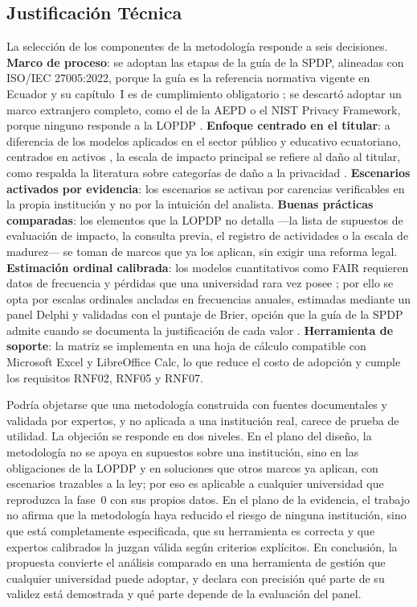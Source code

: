 \subsection{Justificación Técnica}

La selección de los componentes de la metodología responde a seis decisiones. \textbf{Marco de proceso}: se adoptan las etapas de la guía de la SPDP, alineadas con ISO/IEC 27005:2022, porque la guía es la referencia normativa vigente en Ecuador y su capítulo~I es de cumplimiento obligatorio \cite{spdp2025guia,spdp2026guiav2}; se descartó adoptar un marco extranjero completo, como el de la AEPD o el NIST Privacy Framework, porque ninguno responde a la LOPDP \cite{aepd2021riesgo,nist2020privacy}. \textbf{Enfoque centrado en el titular}: a diferencia de los modelos aplicados en el sector público y educativo ecuatoriano, centrados en activos \cite{patino2018ict,lopezvasco2025iso}, la escala de impacto principal se refiere al daño al titular, como respalda la literatura sobre categorías de daño a la privacidad \cite{wairimu2025harm}. \textbf{Escenarios activados por evidencia}: los escenarios se activan por carencias verificables en la propia institución y no por la intuición del analista. \textbf{Buenas prácticas comparadas}: los elementos que la LOPDP no detalla ---la lista de supuestos de evaluación de impacto, la consulta previa, el registro de actividades o la escala de madurez--- se toman de marcos que ya los aplican, sin exigir una reforma legal. \textbf{Estimación ordinal calibrada}: los modelos cuantitativos como FAIR requieren datos de frecuencia y pérdidas que una universidad rara vez posee \cite{wang2020fair}; por ello se opta por escalas ordinales ancladas en frecuencias anuales, estimadas mediante un panel Delphi y validadas con el puntaje de Brier, opción que la guía de la SPDP admite cuando se documenta la justificación de cada valor \cite{spdp2026guiav2}. \textbf{Herramienta de soporte}: la matriz se implementa en una hoja de cálculo compatible con Microsoft Excel y LibreOffice Calc, lo que reduce el costo de adopción y cumple los requisitos RNF02, RNF05 y RNF07.

Podría objetarse que una metodología construida con fuentes documentales y validada por expertos, y no aplicada a una institución real, carece de prueba de utilidad. La objeción se responde en dos niveles. En el plano del diseño, la metodología no se apoya en supuestos sobre una institución, sino en las obligaciones de la LOPDP y en soluciones que otros marcos ya aplican, con escenarios trazables a la ley; por eso es aplicable a cualquier universidad que reproduzca la fase~0 con sus propios datos. En el plano de la evidencia, el trabajo no afirma que la metodología haya reducido el riesgo de ninguna institución, sino que está completamente especificada, que su herramienta es correcta y que expertos calibrados la juzgan válida según criterios explícitos. En conclusión, la propuesta convierte el análisis comparado en una herramienta de gestión que cualquier universidad puede adoptar, y declara con precisión qué parte de su validez está demostrada y qué parte depende de la evaluación del panel.
